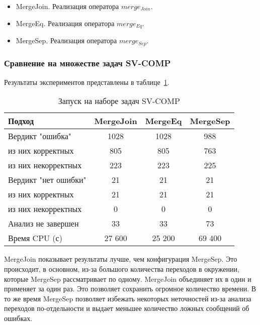 \begin{itemize}
\item MergeJoin. Реализация оператора $merge_{Join}$.
\item MergeEq. Реализация оператора $merge_{Eq}$.
\item MergeSep. Реализация оператора $merge_{Sep}$.
\end{itemize}

\subsubsection{Сравнение на множестве задач SV-COMP}

Результаты экспериментов представлены в таблице~\ref{table-sv-comp-merge}.

\begin{center}
  \begin{table}[h]\footnotesize \centering
    \caption{Запуск на наборе задач SV-COMP}
  	\label{table-sv-comp-merge}
    \begin{tabular}{ | l | c | c | c | }
      \hline
      Подход         				& MergeJoin & MergeEq 	& MergeSep   \\ \hline
      Вердикт "ошибка" 				& 1028    	& 1028		& 988         \\ 
  \hspace{0.5cm} из них корректных 	& 805 		& 805 		& 763      \\ 
  \hspace{0.5cm} из них некорректных & 223 		& 223 		& 225        \\ \hline
      Вердикт "нет ошибки"  		& 21      	& 21        & 21       \\ 
  \hspace{0.5cm} из них корректных 	& 21 		& 21    	& 21        \\
  \hspace{0.5cm} из них некорректных & 0 		& 0    		& 0         \\ \hline
      Анализ не завершен       		& 33     	& 33        & 73       \\ \hline
      Время CPU (с)   				& 27 600 	& 25 200    & 69 400    \\ 
      \hline
    \end{tabular}
  \end{table}
\end{center}

MergeJoin показывает результаты лучше, чем конфигурация MergeSep.
Это происходит, в основном, из-за большого количества переходов в окружении, которые MergeSep рассматривает по одному.
MergeJoin объединяет их в один и применяет за один раз. Это позволяет сохранить огромное количество времени.
В то же время MergeSep позволяет избежать некоторых неточностей из-за анализа переходов по-отдельности и выдает меньшее количество ложных сообщений об ошибках. 

